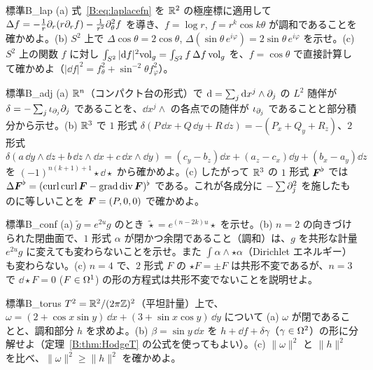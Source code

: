\begin{probl}{標準}{B_lap}
(a) 式~\eqref{B:eq:laplacefn} を $\mathbb R^2$ の極座標に適用して $\Delta f=-\frac1r\partial_r(r\partial_rf)-\frac1{r^2}\partial_\theta^2f$ を導き、$f=\log r$, $f=r^k\cos k\theta$ が調和であることを確かめよ。(b) $S^2$ 上で $\Delta\cos\theta=2\cos\theta$, $\Delta(\sin\theta\,e^{i\varphi})=2\sin\theta\,e^{i\varphi}$ を示せ。(c) $S^2$ 上の関数 $f$ に対し $\int_{S^2}|\mathrm{d} f|^2\mathrm{vol}_g=\int_{S^2}f\,\Delta f\,\mathrm{vol}_g$ を、$f=\cos\theta$ で直接計算して確かめよ（$|\dd f|^2=f_\theta^2+\sin^{-2}\theta f_\varphi^2$）。
\end{probl}

\begin{probl}{標準}{B_adj}
(a) $\mathbb R^n$（コンパクト台の形式）で $\mathrm{d}=\sum_j\mathrm{d} x^j\wedge\partial_j$ の $L^2$ 随伴が $\delta=-\sum_j\iota_{\partial_j}\partial_j$ であることを、$\dd x^j\wedge$ の各点での随伴が $\iota_{\partial_j}$ であることと部分積分から示せ。(b) $\mathbb R^3$ で $1$ 形式 $\delta(P\,\dd x+Q\,\dd y+R\,\dd z)=-(P_x+Q_y+R_z)$、$2$ 形式 $\delta(a\,\dd y\wedge\dd z+b\,\dd z\wedge\dd x+c\,\dd x\wedge\dd y)=(c_y-b_z)\dd x+(a_z-c_x)\dd y+(b_x-a_y)\dd z$ を $(-1)^{n(k+1)+1}\star\dd\star$ から確かめよ。(c) したがって $\mathbb R^3$ の $1$ 形式 $\boldsymbol F^\flat$ では $\Delta\boldsymbol F^\flat=(\operatorname{curl}\operatorname{curl}\boldsymbol F-\operatorname{grad}\operatorname{div}\boldsymbol F)^\flat$ である。これが各成分に $-\sum\partial_j^2$ を施したものに等しいことを $\boldsymbol F=(P,0,0)$ で確かめよ。
\end{probl}

\begin{probl}{標準}{B_conf}
(a) $\tilde g=e^{2u}g$ のとき $\tilde\star=e^{(n-2k)u}\star$ を示せ。(b) $n=2$ の向きづけられた閉曲面で、$1$ 形式 $\alpha$ が閉かつ余閉であること（調和）は、$g$ を共形な計量 $e^{2u}g$ に変えても変わらないことを示せ。また $\int\alpha\wedge\star\alpha$（Dirichlet エネルギー）も変わらない。(c) $n=4$ で、$2$ 形式 $F$ の $\star F=\pm F$ は共形不変であるが、$n=3$ で $\dd\star F=0$ ($F\in\Omega^1$) の形の方程式は共形不変でないことを説明せよ。
\end{probl}

\begin{probl}{標準}{B_torus}
$T^2=\mathbb R^2/(2\pi\mathbb Z)^2$（平坦計量）上で、$\omega=(2+\cos x\sin y)\,\dd x+(3+\sin x\cos y)\,\dd y$ について (a) $\omega$ が閉であることと、調和部分 $h$ を求めよ。(b) $\beta=\sin y\,\dd x$ を $h+\dd f+\delta\gamma$（$\gamma\in\Omega^2$）の形に分解せよ（定理~\ref{B:thm:HodgeT} の公式を使ってもよい）。(c) $\|\omega\|^2$ と $\|h\|^2$ を比べ、$\|\omega\|^2\ge\|h\|^2$ を確かめよ。
\end{probl}

